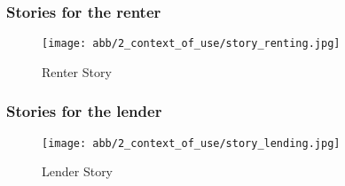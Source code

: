\subsubsection{Stories for the renter}
\begin{figure}[H]
	\centering
	\texttt{[image: abb/2\_context\_of\_use/story\_renting.jpg]}
	\caption{Renter Story}
	\label{fig:story_renter}
\end{figure}


\subsubsection{Stories for the lender}
\begin{figure}[H]
	\centering
	\texttt{[image: abb/2\_context\_of\_use/story\_lending.jpg]}
	\caption{Lender Story}
	\label{fig:story_lender}
\end{figure}

